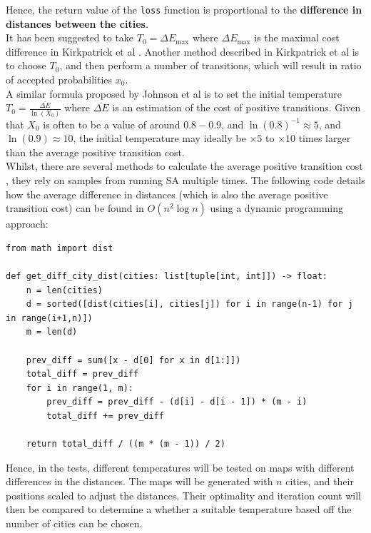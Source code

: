 \documentclass{article}
\begin{document}
Hence, the return value of the \texttt{loss} function is proportional to the \textbf{difference in distances between the cities}.
\\

It has been suggested to take $T_0 = \Delta E_{\text{max}}$ where $\Delta E_{\text{max}}$ is the maximal cost difference in Kirkpatrick et al \cite{kirkpatrick}.
Another method described in Kirkpatrick et al \cite{kirkpatrick} is to choose $T_0$, and then perform a number of transitions, which will result in ratio of accepted probabilities $x_0$.
\\

A similar formula proposed by Johnson et al is to set the initial temperature $T_0 = \frac{\overline{\Delta E}}{\ln(X_0)}$ where $\overline{\Delta E}$ is an estimation of the cost of positive transitions.
Given that $X_0$ is often to be a value of around $0.8 - 0.9$, and $\ln(0.8)^{-1} \approx 5$, and $\ln(0.9) \approx 10$, the initial temperature may ideally be $\times 5$ to  $\times 10$ times larger than the average positive transition cost.
\\

Whilst, there are several methods to calculate the average positive transition cost \cite{initial-temperature}, they rely on samples from running SA multiple times.
The following code details how the average difference in distances (which is also the average positive transition cost) can be found in $O(n^2 \log n)$ using a dynamic programming approach:

\begin{verbatim}
from math import dist

def get_diff_city_dist(cities: list[tuple[int, int]]) -> float:
    n = len(cities)
    d = sorted([dist(cities[i], cities[j]) for i in range(n-1) for j in range(i+1,n)])
    m = len(d)
    
    prev_diff = sum([x - d[0] for x in d[1:]])
    total_diff = prev_diff
    for i in range(1, m):
        prev_diff = prev_diff - (d[i] - d[i - 1]) * (m - i)
        total_diff += prev_diff
    
    return total_diff / ((m * (m - 1)) / 2)
\end{verbatim}

Hence, in the tests, different temperatures will be tested on maps with different differences in the distances.
The maps will be generated with $n$ cities, and their positions scaled to adjust the distances.
Their optimality and iteration count will then be compared to determine a whether a suitable temperature based off the number of cities can be chosen.
\end{document}
